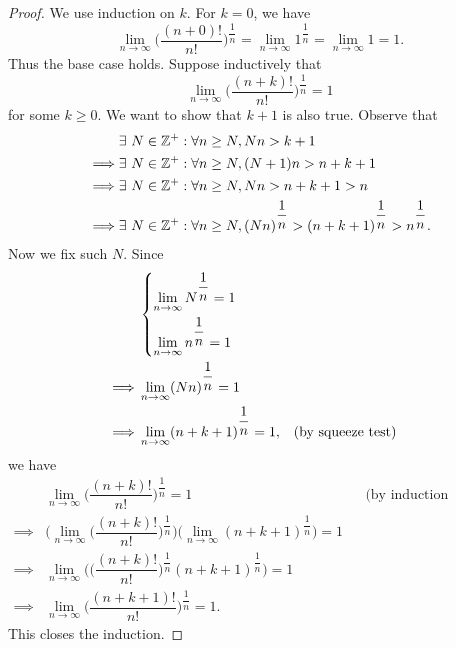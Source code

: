 \begin{proof}
  We use induction on \(k\).
  For \(k = 0\), we have
  \[
    \lim_{n \to \infty} \bigg(\dfrac{(n + 0)!}{n!}\bigg)^{\dfrac{1}{n}} = \lim_{n \to \infty} 1^{\dfrac{1}{n}} = \lim_{n \to \infty} 1 = 1.
  \]
  Thus the base case holds.
  Suppose inductively that
  \[
    \lim_{n \to \infty} \bigg(\dfrac{(n + k)!}{n!}\bigg)^{\dfrac{1}{n}} = 1
  \]
  for some \(k \geq 0\).
  We want to show that \(k + 1\) is also true.
  Observe that
  \begin{align*}
             & \exists\ N \in \mathbb{Z}^+ : \forall n \geq N, Nn > k + 1                                                           \\
    \implies & \exists\ N \in \mathbb{Z}^+ : \forall n \geq N, (N + 1)n > n + k + 1                                                 \\
    \implies & \exists\ N \in \mathbb{Z}^+ : \forall n \geq N, Nn > n + k + 1 > n                                                   \\
    \implies & \exists\ N \in \mathbb{Z}^+ : \forall n \geq N, (Nn)^{\dfrac{1}{n}} > (n + k + 1)^{\dfrac{1}{n}} > n^{\dfrac{1}{n}}.
  \end{align*}
  Now we fix such \(N\).
  Since
  \begin{align*}
             & \begin{dcases}
                 \lim_{n \to \infty} N^{\dfrac{1}{n}} = 1 \\ %
                 \lim_{n \to \infty} n^{\dfrac{1}{n}} = 1 %
               \end{dcases}                                \\
    \implies & \lim_{n \to \infty} (Nn)^{\dfrac{1}{n}} = 1                                                                          \\
    \implies & \lim_{n \to \infty} (n + k + 1)^{\dfrac{1}{n}} = 1,                                    &  & \text{(by squeeze test)}
  \end{align*}
  we have
  \begin{align*}
             & \lim_{n \to \infty} \bigg(\dfrac{(n + k)!}{n!}\bigg)^{\dfrac{1}{n}} = 1                                                                        &  & \text{(by induction hypothesis)} \\
    \implies & \Bigg(\lim_{n \to \infty} \bigg(\dfrac{(n + k)!}{n!}\bigg)^{\dfrac{1}{n}}\Bigg) \bigg(\lim_{n \to \infty} (n + k + 1)^{\dfrac{1}{n}}\bigg) = 1                                       \\
    \implies & \lim_{n \to \infty} \Bigg(\bigg(\dfrac{(n + k)!}{n!}\bigg)^{\dfrac{1}{n}} (n + k + 1)^{\dfrac{1}{n}}\Bigg) = 1                                                                       \\
    \implies & \lim_{n \to \infty} \bigg(\dfrac{(n + k + 1)!}{n!}\bigg)^{\dfrac{1}{n}} = 1.
  \end{align*}
  This closes the induction.
\end{proof}

